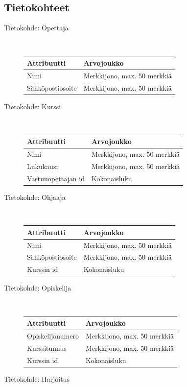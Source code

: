 \documentclass[a4paper,12pt, titlepage]{article}
\begin{document}
\subsection{Tietokohteet}

\begin{description}
	\item[Tietokohde: Opettaja] \hfill \\
	\begin{tabular}{| l | l |}
	\hline
	Attribuutti & Arvojoukko \\ \hline
	Nimi & Merkkijono, max. 50 merkkiä \\ \hline
	Sähköpostiosoite & Merkkijono, max. 50 merkkiä \\ \hline
	\end{tabular}
	\newpage
	\item[Tietokohde: Kurssi] \hfill \\
	\begin{tabular}{| l | l |}
	\hline
	Attribuutti & Arvojoukko \\ \hline
	Nimi & Merkkijono, max. 50 merkkiä \\ \hline
	Lukukausi & Merkkijono, max. 50 merkkiä \\ \hline
	Vastuuopettajan id & Kokonaisluku \\ \hline
	\end{tabular}
	\item[Tietokohde: Ohjaaja] \hfill \\
	\begin{tabular}{| l | l |}
	\hline
	Attribuutti & Arvojoukko \\ \hline
	Nimi & Merkkijono, max. 50 merkkiä \\ \hline
	Sähköpostiosoite & Merkkijono, max. 50 merkkiä \\ \hline
	Kurssin id & Kokonaisluku \\ \hline
	\end{tabular}
	\item[Tietokohde: Opiskelija] \hfill \\
	\begin{tabular}{| l | l |}
	\hline
	Attribuutti & Arvojoukko \\ \hline
	Opiskelijanumero & Merkkijono, max. 50 merkkiä \\ \hline
	Kurssitunnus & Merkkijono, max. 50 merkkiä \\ \hline
	Kurssin id & Kokonaisluku \\ \hline
	\end{tabular}
	\item[Tietokohde: Harjoitus] \hfill \\

\end{description}
\end{document}
